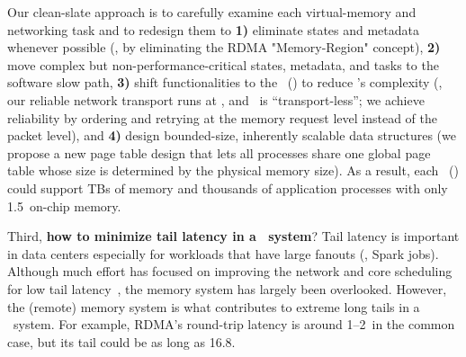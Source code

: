 Our clean-slate approach is to carefully examine each virtual-memory and networking task 
and to redesign them to \textbf{1)} eliminate states and metadata whenever possible (\eg, by eliminating the RDMA "Memory-Region" concept),
\textbf{2)} move complex but non-performance-critical states, metadata, and tasks to the software slow path,
\textbf{3)} shift functionalities to the \CN\ (\syslib) to reduce \MN's complexity 
(\eg, our reliable network transport runs at \syslib, and \MN\ is ``transport-less''; we achieve reliability by ordering and retrying at the memory request level instead of the packet level),
and \textbf{4)} design bounded-size, inherently scalable data structures (we propose a new page table design that lets all processes share one global page table whose size is determined by the physical memory size).
As a result, each \MN\ (\sysboard) could support TBs of memory and thousands of application processes with only 1.5\MB\ on-chip memory.

Third, \textbf{how to minimize tail latency in a \md\ system}?
Tail latency is important in data centers especially for workloads that have large fanouts (\eg, Spark jobs).
Although much effort has focused on improving the network and core scheduling for low tail latency~\cite{nanoPU,Shenango,Shinjuku,ZygOS,RPCValet},
the memory system has largely been overlooked.
However, the (remote) memory system is what contributes to extreme long tails in a \md\ system.
For example, RDMA's round-trip latency is around 1--2\mus\ in the common case,
but its tail could be as long as 16.8\ms. %

